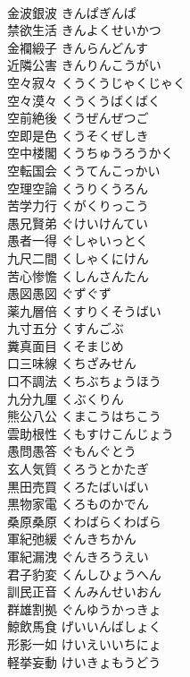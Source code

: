 \documentclass[8pt]{extreport}
\begin{document}
\begin{CJK}{UTF8}{min}
\\	金波銀波	きんぱぎんぱ	
\\	禁欲生活	きんよくせいかつ	
\\	金襴緞子	きんらんどんす	
\\	近隣公害	きんりんこうがい	
\\	空々寂々	くうくうじゃくじゃく	
\\	空々漠々	くうくうばくばく	
\\	空前絶後	くうぜんぜつご	
\\	空即是色	くうそくぜしき	
\\	空中楼閣	くうちゅうろうかく	
\\	空転国会	くうてんこっかい	
\\	空理空論	くうりくうろん	
\\	苦学力行	くがくりっこう	
\\	愚兄賢弟	ぐけいけんてい	
\\	愚者一得	ぐしゃいっとく	
\\	九尺二間	くしゃくにけん	
\\	苦心惨憺	くしんさんたん	
\\	愚図愚図	ぐずぐず	
\\	薬九層倍	くすりくそうばい	
\\	九寸五分	くすんごぶ	
\\	糞真面目	くそまじめ	
\\	口三味線	くちざみせん	
\\	口不調法	くちぶちょうほう	
\\	九分九厘	くぶくりん	
\\	熊公八公	くまこうはちこう	
\\	雲助根性	くもすけこんじょう	
\\	愚問愚答	ぐもんぐとう	
\\	玄人気質	くろうとかたぎ	
\\	黒田売買	くろたばいばい	
\\	黒物家電	くろものかでん	
\\	桑原桑原	くわばらくわばら	
\\	軍紀弛緩	ぐんきちかん	
\\	軍紀漏洩	ぐんきろうえい	
\\	君子豹変	くんしひょうへん	
\\	訓民正音	くんみんせいおん	
\\	群雄割拠	ぐんゆうかっきょ	
\\	鯨飲馬食	げいいんばしょく	
\\	形影一如	けいえいいちにょ	
\\	軽挙妄動	けいきょもうどう	

\end{CJK}
\end{document}
